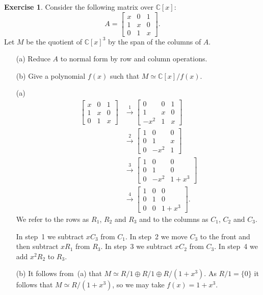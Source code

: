 \documentclass{amsart}
\newcommand{\bbm}       {\left[\begin{matrix}}
\newcommand{\ebm}       {\end{matrix}\right]}
\newcommand{\C}         {{\mathbb{C}}}
\newcommand{\xra}       {\xrightarrow}
\newcommand{\ip}[1]     {\langle #1\rangle}
\newcommand{\op}        {\oplus}
\renewcommand{\:}{\colon}
\theoremstyle{definition}
\newtheorem{exercise}{Exercise}[section]
\renewenvironment{solution}{\SolutionAtEnd}{\endSolutionAtEnd}
\begin{document}
\begin{exercise}
 Consider the following matrix over $\C[x]$:
 \[ A = \bbm x & 0 & 1 \\ 1 & x & 0 \\ 0 & 1 & x \ebm. \]
 Let $M$ be the quotient of $\C[x]^3$ by the span of the columns of
 $A$. 
 \begin{itemize}
  \item[(a)] Reduce $A$ to normal form by row and column operations.
  \item[(b)] Give a polynomial $f(x)$ such that $M\simeq\C[x]/f(x)$.
 \end{itemize}
\end{exercise}
\begin{solution}
 \begin{itemize}
  \item[(a)] 
   \begin{align*}
    \bbm x & 0 & 1 \\ 1 & x & 0 \\ 0 & 1 & x \ebm 
    &\xra{1} \bbm 0 & 0 & 1 \\ 1 & x & 0 \\ -x^2 & 1 & x \ebm \\
    &\xra{2} \bbm 1 & 0 & 0 \\ 0 & 1 & x \\ 0 & -x^2 & 1 \ebm \\
    &\xra{3} \bbm 1 & 0 & 0 \\ 0 & 1 & 0 \\ 0 & -x^2 & 1+x^3 \ebm \\
    &\xra{4} \bbm 1 & 0 & 0 \\ 0 & 1 & 0 \\ 0 & 0 & 1+x^3 \ebm.
   \end{align*}
   We refer to the rows as $R_1$, $R_2$ and $R_3$ and to the columns
   as $C_1$, $C_2$ and $C_3$. 

   In step~1 we subtract $xC_3$ from $C_1$.  In step~2 we move $C_3$
   to the front and then subtract $xR_1$ from $R_3$.  In step~3 we
   subtract $xC_2$ from $C_3$.  In step~4 we add $x^2R_2$ to $R_3$. 
  \item[(b)]
   It follows from~(a) that $M\simeq R/1\op R/1\op R/(1+x^3)$.  As
   $R/1=\{0\}$ it follows that $M\simeq R/(1+x^3)$, so we may take
   $f(x)=1+x^3$.
 \end{itemize}
\end{solution}
\end{document}
